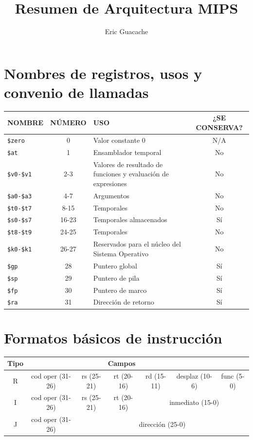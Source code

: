 \documentclass[12pt,a4paper]{article}
\title{Resumen de Arquitectura MIPS}
\author{Eric Guacache}
\date{}
\begin{document}
	
	\maketitle
	
	\section*{Nombres de registros, usos y convenio de llamadas}
	
	\begin{table}[H]
		\centering
		\small
		\begin{tabularx}{\textwidth}{l | c | X | c}
			\toprule
			\textbf{NOMBRE} & \textbf{NÚMERO} & \textbf{USO} & \textbf{¿SE CONSERVA?} \\
			\midrule
			\texttt{\$zero} & 0 & Valor constante 0 & N/A \\
			\texttt{\$at} & 1 & Ensamblador temporal & No \\
			\texttt{\$v0-\$v1} & 2-3 & Valores de resultado de funciones y evaluación de expresiones & No \\
			\texttt{\$a0-\$a3} & 4-7 & Argumentos & No \\
			\texttt{\$t0-\$t7} & 8-15 & Temporales & No \\
			\texttt{\$s0-\$s7} & 16-23 & Temporales almacenados & Sí \\
			\texttt{\$t8-\$t9} & 24-25 & Temporales & No \\
			\texttt{\$k0-\$k1} & 26-27 & Reservados para el núcleo del Sistema Operativo & No \\
			\texttt{\$gp} & 28 & Puntero global & Sí \\
			\texttt{\$sp} & 29 & Puntero de pila & Sí \\
			\texttt{\$fp} & 30 & Puntero de marco & Sí \\
			\texttt{\$ra} & 31 & Dirección de retorno & Sí \\
			\bottomrule
		\end{tabularx}
	\end{table}
	
	\section*{Formatos básicos de instrucción}
	
	\begin{table}[H] 
		\centering
		\begin{tabular}{c|c|c|c|c|c|c}
			\toprule
			\textbf{Tipo} & \multicolumn{5}{c}{\textbf{Campos}} & \\
			\midrule
			R & cod oper (31-26) & rs (25-21) & rt (20-16) & rd (15-11) & desplaz (10-6) & func (5-0) \\
			\midrule
			I & cod oper (31-26) & rs (25-21) & rt (20-16) & \multicolumn{3}{c}{inmediato (15-0)} \\
			\midrule
			J & cod oper (31-26) & \multicolumn{5}{c}{dirección (25-0)} \\
			\bottomrule
		\end{tabular}
	\end{table}
	
\end{document}
